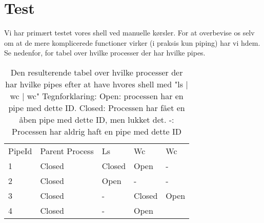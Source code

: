 \section{Test}
Vi har primært testet vores shell ved manuelle kørsler. For at overbevise os selv om at de mere komplicerede functioner virker (i praksis kun piping) har vi h dem. Se nedenfor, for tabel over hvilke processer der har hvilke pipes. 

\begin{table}[]
\centering
\begin{tabular}{lllll}
PipeId & Parent Process & Ls & Wc & Wc \\
1 & Closed & Closed & Open & - \\
2 & Closed & Open & - & - \\
3 & Closed & - & Closed & Open \\
4 & Closed & - & Open & 
\end{tabular}
\caption{Den resulterende tabel over hvilke processer der har hvilke pipes efter at have h vores shell med "ls | wc | wc" Tegnforklaring: Open: processen har en  pipe med dette ID. Closed: Processen har fået en åben pipe med dette ID, men lukket det. -: Processen har aldrig haft en pipe med dette ID}
\label{test-tabel}
\end{table}
